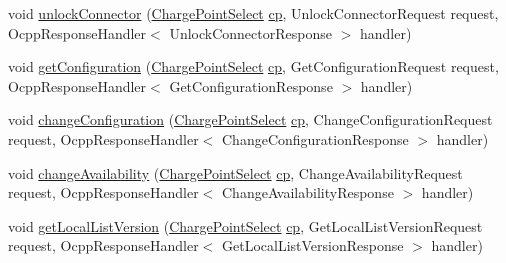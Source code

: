 \begin{DoxyCompactItemize}
\item 
void \hyperlink{classde_1_1rwth_1_1idsg_1_1steve_1_1ocpp_1_1soap_1_1_charge_point_service15___soap_invoker_af29c600b4f55e5ab8538181528b97aa3}{unlock\+Connector} (\hyperlink{classde_1_1rwth_1_1idsg_1_1steve_1_1repository_1_1dto_1_1_charge_point_select}{Charge\+Point\+Select} \hyperlink{get_transaction_ids_8js_a02fb69feb56940fd46d72ea6a60e511f}{cp}, Unlock\+Connector\+Request request, Ocpp\+Response\+Handler$<$ Unlock\+Connector\+Response $>$ handler)
\item 
void \hyperlink{classde_1_1rwth_1_1idsg_1_1steve_1_1ocpp_1_1soap_1_1_charge_point_service15___soap_invoker_a006d420e0756623c68c01eb75fc32e8c}{get\+Configuration} (\hyperlink{classde_1_1rwth_1_1idsg_1_1steve_1_1repository_1_1dto_1_1_charge_point_select}{Charge\+Point\+Select} \hyperlink{get_transaction_ids_8js_a02fb69feb56940fd46d72ea6a60e511f}{cp}, Get\+Configuration\+Request request, Ocpp\+Response\+Handler$<$ Get\+Configuration\+Response $>$ handler)
\item 
void \hyperlink{classde_1_1rwth_1_1idsg_1_1steve_1_1ocpp_1_1soap_1_1_charge_point_service15___soap_invoker_a1da6ac781c9faf40e5f16d26d72fb0bf}{change\+Configuration} (\hyperlink{classde_1_1rwth_1_1idsg_1_1steve_1_1repository_1_1dto_1_1_charge_point_select}{Charge\+Point\+Select} \hyperlink{get_transaction_ids_8js_a02fb69feb56940fd46d72ea6a60e511f}{cp}, Change\+Configuration\+Request request, Ocpp\+Response\+Handler$<$ Change\+Configuration\+Response $>$ handler)
\item 
void \hyperlink{classde_1_1rwth_1_1idsg_1_1steve_1_1ocpp_1_1soap_1_1_charge_point_service15___soap_invoker_a8e5d3a5c9a04e9774cbf8b9bf3d81e6f}{change\+Availability} (\hyperlink{classde_1_1rwth_1_1idsg_1_1steve_1_1repository_1_1dto_1_1_charge_point_select}{Charge\+Point\+Select} \hyperlink{get_transaction_ids_8js_a02fb69feb56940fd46d72ea6a60e511f}{cp}, Change\+Availability\+Request request, Ocpp\+Response\+Handler$<$ Change\+Availability\+Response $>$ handler)
\item 
void \hyperlink{classde_1_1rwth_1_1idsg_1_1steve_1_1ocpp_1_1soap_1_1_charge_point_service15___soap_invoker_a73f9493312a541bc4d7ecb667eee2e11}{get\+Local\+List\+Version} (\hyperlink{classde_1_1rwth_1_1idsg_1_1steve_1_1repository_1_1dto_1_1_charge_point_select}{Charge\+Point\+Select} \hyperlink{get_transaction_ids_8js_a02fb69feb56940fd46d72ea6a60e511f}{cp}, Get\+Local\+List\+Version\+Request request, Ocpp\+Response\+Handler$<$ Get\+Local\+List\+Version\+Response $>$ handler)
\item 

\end{DoxyCompactItemize}
